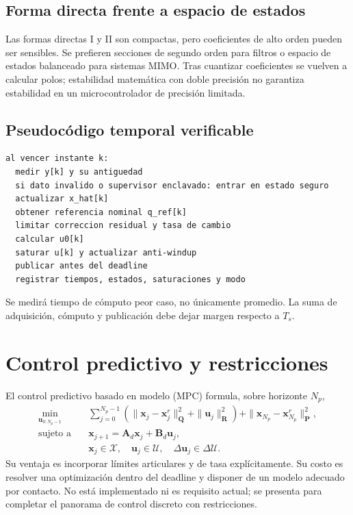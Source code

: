 \documentclass[11pt,letterpaper]{article}
\newcommand{\vect}[1]{\bm{#1}}
\newcommand{\mat}[1]{\bm{#1}}
\begin{document}
\subsection{Forma directa frente a espacio de estados}
Las formas directas I y II son compactas, pero coeficientes de alto orden pueden
ser sensibles. Se prefieren secciones de segundo orden para filtros o espacio
de estados balanceado para sistemas MIMO. Tras cuantizar coeficientes se vuelven
a calcular polos; estabilidad matemática con doble precisión no garantiza
estabilidad en un microcontrolador de precisión limitada.

\subsection{Pseudocódigo temporal verificable}
\begin{verbatim}
al vencer instante k:
  medir y[k] y su antiguedad
  si dato invalido o supervisor enclavado: entrar en estado seguro
  actualizar x_hat[k]
  obtener referencia nominal q_ref[k]
  limitar correccion residual y tasa de cambio
  calcular u0[k]
  saturar u[k] y actualizar anti-windup
  publicar antes del deadline
  registrar tiempos, estados, saturaciones y modo
\end{verbatim}
Se medirá tiempo de cómputo peor caso, no únicamente promedio. La suma de
adquisición, cómputo y publicación debe dejar margen respecto a $T_s$.

\section{Control predictivo y restricciones}
El control predictivo basado en modelo (MPC) formula, sobre horizonte $N_p$,
\begin{align}
 \min_{\vect u_{0:N_p-1}}\quad &
 \sum_{j=0}^{N_p-1}(\|\vect x_j-\vect x_j^r\|_{\mat Q}^2+
 \|\vect u_j\|_{\mat R}^2)+\|\vect x_{N_p}-\vect x_{N_p}^r\|_{\mat P}^2,\\
 \text{sujeto a}\quad &\vect x_{j+1}=\mat A_d\vect x_j+\mat B_d\vect u_j,\\
 &\vect x_j\in\mathcal X,\quad\vect u_j\in\mathcal U,
 \quad\Delta\vect u_j\in\Delta\mathcal U.
\end{align}
Su ventaja es incorporar límites articulares y de tasa explícitamente. Su costo
es resolver una optimización dentro del deadline y disponer de un modelo
adecuado por contacto. No está implementado ni es requisito actual; se presenta
para completar el panorama de control discreto con restricciones.
\end{document}
